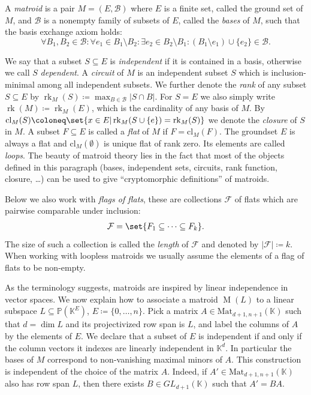 \documentclass[12pt,a4paper,english]{scrartcl}
\newcommand{\KK}{\mathbb{K}}
\newcommand{\PP}{\mathbb{P}}
\DeclareMathOperator{\rank}{rk}
\DeclareMathOperator{\Matroid}{M}
\begin{document}
\begin{definition}\label{def: matroid}
A \emph{matroid} is a pair $M = (E,\mathcal{B})$ where $E$ is a finite set, called the ground set of $M$, and $\mathcal{B}$ is a nonempty family of subsets of $E$, called the \emph{bases} of $M$, such that the basis exchange axiom holds:
\[
\forall B_1,B_2\in \mathcal{B}:\forall e_1\in B_1\setminus B_2 : \exists e_2\in B_2\setminus B_1: (B_1\setminus e_1)\cup \{e_2\}\in \mathcal{B}.
\]
\end{definition}
We say that a subset $S\subseteq E$ is \emph{independent} if it is contained in a basis, otherwise we call $S$ \emph{dependent}. A \emph{circuit} of $M$ is an independent subset $S$ which is inclusion-minimal among all independent subsets. We further denote the \emph{rank} of any subset $S\subseteq E$ by $\rank_M(S)\coloneq \max_{B\in \mathcal{B}}|S\cap B|$. For $S=E$ we also simply write $\rank(M)\coloneq \rank_M(E)$, which is the cardinality of any basis of $M$. By $\text{cl}_M(S)\coloneq\set{x\in E| \rank_M(S\cup\{e\})=\rank_M(S)}$ we denote the \emph{closure} of $S$ in $M$. A subset $F\subseteq E$ is called a \emph{flat} of $M$ if $F=\text{cl}_M(F)$. The groundset $E$ is always a flat and $\text{cl}_M(\emptyset)$ is unique flat of rank zero. Its elements are called \emph{loops}. The beauty of matroid theory lies in the fact that most of the objects defined in this paragraph (bases, independent sets, circuits, rank function, closure, \dots) can be used to give \enquote{cryptomorphic definitions} of matroids.

Below we also work with \emph{flags of flats}, these are collections $\mathcal{F}$ of flats which are pairwise comparable under inclusion:
\begin{align*}
    \mathcal{F}=\set{F_1\subseteq \dots \subseteq F_k}.
\end{align*}
The size of such a collection is called the \emph{length} of $\mathcal{F}$ and denoted by $|\mathcal{F|}\coloneq k$. When working with loopless matroids we usually assume the elements of a flag of flats to be non-empty.


As the terminology suggests, matroids are inspired by linear independence in vector spaces. We now explain how to associate a matroid $\Matroid(L)$ to a linear subspace $L\subseteq \PP(\KK^E)$, $E \coloneq \{0,\dots,n\}$.
Pick a matrix $A \in \text{Mat}_{d+1,n+1}(\KK)$ such that $d=\dim L$ and its projectivized row span is $L$, and label the columns of $A$ by the elements of $E$. We declare that a subset of $E$ is independent if and only if the column vectors it indexes are linearly independent in $\KK^d$. In particular the bases of $M$ correspond to non-vanishing maximal minors of $A$.
This construction is independent of the choice of the matrix $A$. Indeed, if $A'\in \text{Mat}_{d+1,n+1}(\KK)$ also has row span $L$, then there exists $B \in GL_{d+1}(\KK)$ such that $A' = BA$. %
\end{document}
